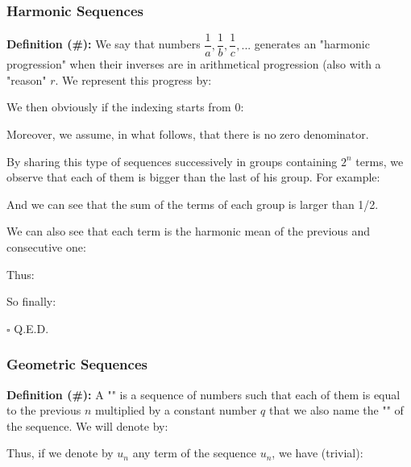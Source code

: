 	\pagebreak
	\subsubsection{Harmonic Sequences}

\textbf{Definition (\#\mydef):} We say that numbers $\dfrac{1}{a}, \dfrac{1}{b}, \dfrac{1}{c},...$ generates an "harmonic progression" when their inverses are in arithmetical progression (also with a "reason" $r$. We represent this progress by:
	
We then obviously if the indexing starts from 0:
	
Moreover, we assume, in what follows, that there is no zero denominator.

By sharing this type of sequences successively in groups containing $2^n$ terms, we observe that each of them is bigger than the last of his group. For example:
	
And we can see that the sum of the terms of each group is larger than 1/2.

We can also see that each term is the harmonic mean of the previous and consecutive one:

\begin{dem}
	
Thus:
	
So finally:
		
	\begin{flushright}
		$\square$  Q.E.D.
	\end{flushright}
\end{dem}

	\subsubsection{Geometric Sequences}
\textbf{Definition (\#\mydef):} A "\label{geometric sequence}" is a sequence of numbers such that each of them is equal to the previous $n$ multiplied by a constant number $q$ that we also name the "" of the sequence. We will denote by:
	
Thus, if we denote by $u_n$ any term of the sequence $u_n$, we have (trivial):
	
